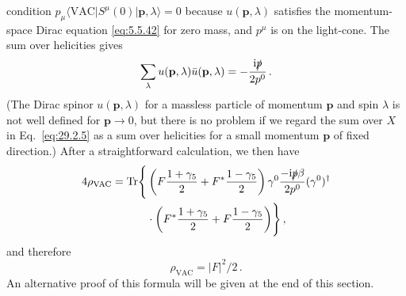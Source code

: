 condition
\(p_\mu\langle\mathrm{VAC}\lvert S^\mu(0)
\rvert\mathbf p,\lambda\rangle=0\) because \(u(\mathbf p,\lambda)\)
satisfies the momentum-space Dirac equation \eqref{eq:5.5.42} for zero
mass, and \(p^\mu\) is on the light-cone. The sum over helicities gives
\[
  \sum_\lambda u(\mathbf p,\lambda)\bar u(\mathbf p,\lambda)
  =-\frac{\mathrm{i}\slashed{p}}{2p^0}\,.
\]
(The Dirac spinor \(u(\mathbf p,\lambda)\) for a massless particle of
momentum \(\mathbf p\) and spin \(\lambda\) is not well defined for
\(\mathbf p\to0\), but there is no problem if we regard the sum over
\(X\) in Eq.~\eqref{eq:29.2.5} as a sum over helicities for a small
momentum \(\mathbf p\) of fixed direction.) After a straightforward
calculation, we then have
\[
  \begin{aligned}
  4\rho_{\mathrm{VAC}}
  =\operatorname{Tr}\Biggl\{&
    \left(
      F\frac{1+\gamma_5}{2}
      +F^*\frac{1-\gamma_5}{2}
    \right)
    \gamma^0\frac{-\mathrm{i}\slashed{p}\beta}{2p^0}(\gamma^0)^\dagger
  \\
  &{}\cdot
    \left(
      F^*\frac{1+\gamma_5}{2}
      +F\frac{1-\gamma_5}{2}
    \right)
  \Biggr\}\,,
  \end{aligned}
\]
and therefore
\begin{equation}
  \rho_{\mathrm{VAC}}=\lvert F\rvert^2/2\,.
  \tag{29.2.8}\label{eq:29.2.8}
\end{equation}
An alternative proof of this formula will be given at the end of this
section.

